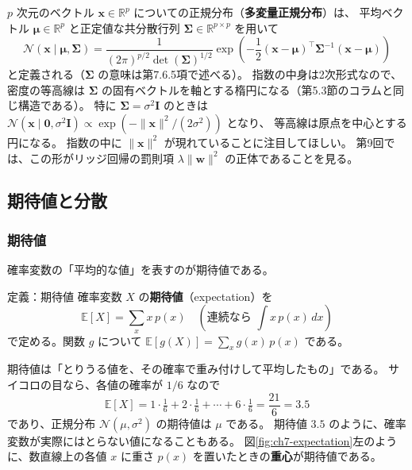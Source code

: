 $p$ 次元のベクトル $\bm{x} \in \mathbb{R}^p$ についての正規分布（\textbf{多変量正規分布}）は、
平均ベクトル $\bm{\mu} \in \mathbb{R}^p$ と正定値な共分散行列 $\bm{\Sigma} \in \mathbb{R}^{p \times p}$ を用いて
\begin{equation}
  \mathcal{N}(\bm{x} \mid \bm{\mu}, \bm{\Sigma})
  = \frac{1}{(2\pi)^{p/2} \det(\bm{\Sigma})^{1/2}}
    \exp\!\left( -\frac{1}{2} (\bm{x} - \bm{\mu})^\top \bm{\Sigma}^{-1} (\bm{x} - \bm{\mu}) \right)
  \label{eq:ch7-mvn}
\end{equation}
と定義される（$\bm{\Sigma}$ の意味は第7.6.5項で述べる）。
指数の中身は2次形式なので、密度の等高線は $\bm{\Sigma}$ の固有ベクトルを軸とする楕円になる（第5.3節のコラムと同じ構造である）。
特に $\bm{\Sigma} = \sigma^2\bm{I}$ のときは
$\mathcal{N}(\bm{x} \mid \bm{0}, \sigma^2\bm{I}) \propto \exp\!\left( -\|\bm{x}\|^2/(2\sigma^2) \right)$ となり、
等高線は原点を中心とする円になる。
指数の中に $\|\bm{x}\|^2$ が現れていることに注目してほしい。
第9回では、この形がリッジ回帰の罰則項 $\lambda\|\bm{w}\|^2$ の正体であることを見る。


\subsection{期待値と分散}

\subsubsection{期待値}

確率変数の「平均的な値」を表すのが期待値である。

\begin{itembox}[l]{定義：期待値}
確率変数 $X$ の\textbf{期待値}（expectation）を
\begin{equation}
  \mathbb{E}[X] = \sum_x x\,p(x) \quad \left(\text{連続なら } \int x\,p(x)\,dx\right)
  \label{eq:ch7-expect}
\end{equation}
で定める。関数 $g$ について $\mathbb{E}[g(X)] = \sum_x g(x)\,p(x)$ である。
\end{itembox}

期待値は「とりうる値を、その確率で重み付けして平均したもの」である。
サイコロの目なら、各値の確率が $1/6$ なので
\begin{equation*}
  \mathbb{E}[X] = 1 \cdot \tfrac{1}{6} + 2 \cdot \tfrac{1}{6} + \cdots + 6 \cdot \tfrac{1}{6} = \frac{21}{6} = 3.5
\end{equation*}
であり、正規分布 $\mathcal{N}(\mu, \sigma^2)$ の期待値は $\mu$ である。
期待値 $3.5$ のように、確率変数が実際にはとらない値になることもある。
図\ref{fig:ch7-expectation}左のように、数直線上の各値 $x$ に重さ $p(x)$ を置いたときの\textbf{重心}が期待値である。

